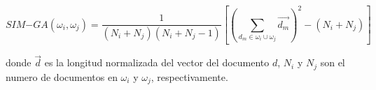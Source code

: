   \begin{equation}\label{eq:simga}
    SIM\mathrm{-}GA(\omega_i,\omega_j)=\frac{1}{(N_i+N_j)(N_i+N_j-1)}[(\sum_{d_m\in\omega_i\cup\omega_j}\vec{d_m})^2-(N_i+N_j)]
  \end{equation}

  donde $\vec{d}$ es la longitud normalizada del vector del documento $d$, $N_i$ y $N_j$ son el numero de documentos en $\omega_i$ y $\omega_j$, respectivamente.\cite{informationretrieval}
